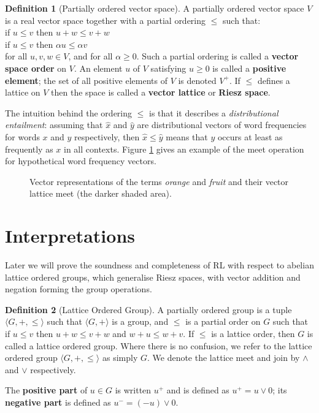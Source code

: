 \documentclass[journal]{IEEEtran}
\theoremstyle{definition}
\newtheorem{definition}{Definition}
\begin{document}
\begin{definition}[Partially ordered vector space]
A partially ordered vector space $V$ is a real vector space together with a partial ordering $\le$ such that:
\vspace{0.1cm}\\
\indent if $u \le v$ then $u + w \le v + w$\\
\indent if $u \le v$ then $\alpha u \le \alpha v$
\vspace{0.1cm}\\
for all $u,v,w \in V$, and for all $\alpha \ge 0$. Such a partial ordering is called a \textbf{vector space order} on $V$. An element $u$ of $V$ satisfying $u \ge 0$ is called a \textbf{positive element}; the set of all positive elements of $V$ is denoted $V^+$. If $\le$ defines a lattice on $V$ then the space is called a \textbf{vector lattice} or \textbf{Riesz space}.
\end{definition}

The intuition behind the ordering $\le$ is that it describes a
\emph{distributional entailment}: assuming that $\hat{x}$ and
$\hat{y}$ are distributional vectors of word frequencies for words $x$
and $y$ respectively, then $\hat{x} \le \hat{y}$ means that $y$ occurs
at least as frequently as $x$ in all contexts. Figure
\ref{fig:orangefruit} gives an example of the meet operation for
hypothetical word frequency vectors.

\begin{figure}
\begin{center}

\caption{Vector representations of the terms \emph{orange} and
  \emph{fruit} and their vector lattice meet (the darker shaded
  area).}
\label{fig:orangefruit}
\end{center}
\end{figure}


\section{Interpretations}

Later we will prove the soundness and completeness of RL with respect
to abelian lattice ordered groups, which generalise Riesz spaces, with
vector addition and negation forming the group operations.

\begin{definition}[Lattice Ordered Group]
  A partially ordered group is a tuple $\langle G, +, \le\rangle$ such
  that $\langle G, +\rangle$ is a group, and $\le$ is a partial order
  on $G$ such that if $u \le v$ then $u + w \le v + w$ and $w + u \le
  w + v$. If $\le$ is a lattice order, then $G$ is called a lattice
  ordered group. Where there is no confusion, we refer to the lattice
  ordered group $\langle G, +, \le\rangle$ as simply $G$. We denote
  the lattice meet and join by $\land$ and $\lor$ respectively.

  The \textbf{positive part} of $u\in G$ is written $u^+$ and is defined
  as $u^+ = u\lor 0$; its \textbf{negative part} is defined as $u^- =
  (-u)\lor 0$.
\end{definition}
\end{document}

